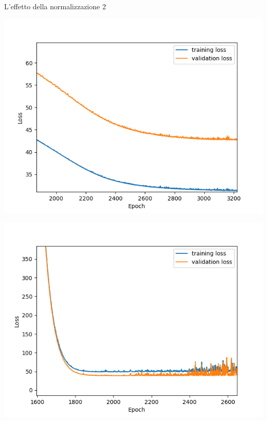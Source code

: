 \documentclass{beamer}
\begin{document}

\begin{frame}{L'effetto della normalizzazione 2}
\centering
\begin{minipage}{0.48\textwidth}
	\includegraphics[width=\textwidth]{Figure_4.png}
	\label{historyNormalised2}
\end{minipage}
\begin{minipage}{0.48\textwidth}
	\includegraphics[width=\textwidth]{History_subplot_3.png}
	\label{historyNonNormalised2}
\end{minipage}

\end{frame}
\end{document}
